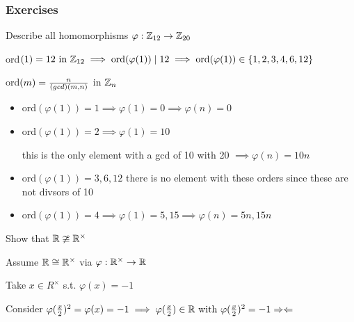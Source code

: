 \subsubsection{Exercises}
\begin{example}
    Describe all homomorphisms $\varphi : \mathbb{Z}_{12}\rightarrow\mathbb{Z}_{20}$

    ord$(1)=12 \text{ in } \mathbb{Z}_{12} \implies \text{ord}(\varphi(1)) \mid 12 \implies \text{ord}(\varphi(1))\in \left\{ 1,2,3,4,6,12 \right\}$

    ord$(m)=\frac{n}{\text{(}gcd)(m,n)}$ in $\mathbb{Z}_n$
    \begin{itemize}
        \item ord$(\varphi(1))=1 \implies \varphi(1)=0\implies \varphi(n)=0$
        \item ord$(\varphi(1))=2 \implies \varphi(1)=10$ 
        
        this is the only element with a gcd of 10 with 20 $\implies \varphi(n)=10n$

        \item ord$(\varphi(1))=3,6,12$ there is no element with these orders since these are not divsors of 10
        \item ord$(\varphi(1))=4 \implies \varphi(1)=5,15 \implies \varphi(n)=5n,15n$
    \end{itemize}
\end{example}

\begin{example}
    Show that $\mathbb{R} \ncong \mathbb{R}^\times$

    Assume $\mathbb{R} \cong \mathbb{R}^\times$ via $\varphi: \mathbb{R}^\times \rightarrow \mathbb{R}$

    Take $x \in R^\times$ s.t. $\varphi(x)=-1$

    Consider $\varphi(\frac{x}{2})^2=\varphi(x)=-1 \implies \varphi(\frac{x}{2})\in \mathbb{R} \text{ with } \varphi(\frac{x}{2})^2=-1 \Rightarrow \Leftarrow$
\end{example}